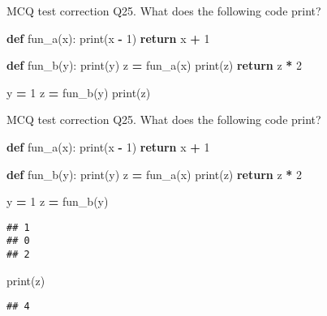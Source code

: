 \documentclass[
  8pt,
  ignorenonframetext,
]{beamer}
\newenvironment{Shaded}{\begin{snugshade}}{\end{snugshade}}
\newcommand{\BuiltInTok}[1]{#1}
\newcommand{\ControlFlowTok}[1]{\textcolor[rgb]{0.13,0.29,0.53}{\textbf{#1}}}
\newcommand{\DecValTok}[1]{\textcolor[rgb]{0.00,0.00,0.81}{#1}}
\newcommand{\KeywordTok}[1]{\textcolor[rgb]{0.13,0.29,0.53}{\textbf{#1}}}
\newcommand{\NormalTok}[1]{#1}
\newcommand{\OperatorTok}[1]{\textcolor[rgb]{0.81,0.36,0.00}{\textbf{#1}}}
\begin{document}
\begin{frame}[fragile]{MCQ test correction}
\protect\hypertarget{mcq-test-correction-48}{}
Q25. What does the following code print?

\begin{Shaded}
\begin{Highlighting}[]
\KeywordTok{def}\NormalTok{ fun\_a(x):}
    \BuiltInTok{print}\NormalTok{(x }\OperatorTok{{-}} \DecValTok{1}\NormalTok{)}
    \ControlFlowTok{return}\NormalTok{ x }\OperatorTok{+} \DecValTok{1}

\KeywordTok{def}\NormalTok{ fun\_b(y):}
    \BuiltInTok{print}\NormalTok{(y)}
\NormalTok{    z }\OperatorTok{=}\NormalTok{ fun\_a(x)}
    \BuiltInTok{print}\NormalTok{(z)}
    \ControlFlowTok{return}\NormalTok{ z }\OperatorTok{*} \DecValTok{2}

\NormalTok{y }\OperatorTok{=} \DecValTok{1}
\NormalTok{z }\OperatorTok{=}\NormalTok{ fun\_b(y)}
\BuiltInTok{print}\NormalTok{(z)}
\end{Highlighting}
\end{Shaded}
\end{frame}

\begin{frame}[fragile]{MCQ test correction}
\protect\hypertarget{mcq-test-correction-49}{}
Q25. What does the following code print?

\begin{Shaded}
\begin{Highlighting}[]
\KeywordTok{def}\NormalTok{ fun\_a(x):}
    \BuiltInTok{print}\NormalTok{(x }\OperatorTok{{-}} \DecValTok{1}\NormalTok{)}
    \ControlFlowTok{return}\NormalTok{ x }\OperatorTok{+} \DecValTok{1}

\KeywordTok{def}\NormalTok{ fun\_b(y):}
    \BuiltInTok{print}\NormalTok{(y)}
\NormalTok{    z }\OperatorTok{=}\NormalTok{ fun\_a(x)}
    \BuiltInTok{print}\NormalTok{(z)}
    \ControlFlowTok{return}\NormalTok{ z }\OperatorTok{*} \DecValTok{2}

\NormalTok{y }\OperatorTok{=} \DecValTok{1}
\NormalTok{z }\OperatorTok{=}\NormalTok{ fun\_b(y)}
\end{Highlighting}
\end{Shaded}

\begin{verbatim}
## 1
## 0
## 2
\end{verbatim}

\begin{Shaded}
\begin{Highlighting}[]
\BuiltInTok{print}\NormalTok{(z)}
\end{Highlighting}
\end{Shaded}

\begin{verbatim}
## 4
\end{verbatim}
\end{frame}
\end{document}
